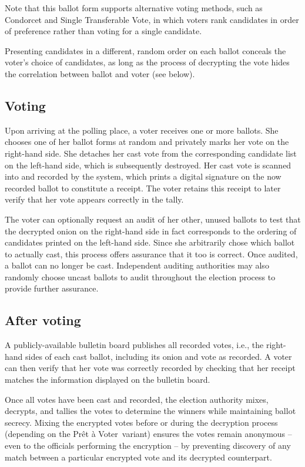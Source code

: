 \documentclass[10pt,twocolumn]{article}
\newcommand{\preta}{Pr\^{e}t \`{a}}
\newcommand{\pv}{\preta{} Voter}
\begin{document}
Note that this ballot form supports alternative voting methods, such as Condorcet and Single Transferable Vote, in which voters rank candidates in order of preference rather than voting for a single candidate.

Presenting candidates in a different, random order on each ballot conceals the voter's choice of candidates, as long as the process of decrypting the vote hides the correlation between ballot and voter (see below).

\subsection{Voting}

Upon arriving at the polling place, a voter receives one or more ballots.
She chooses one of her ballot forms at random and privately marks her vote on the right-hand side.
She detaches her cast vote from the corresponding candidate list on the left-hand side, which is subsequently destroyed.
Her cast vote is scanned into and recorded by the system, which prints a digital signature on the now recorded ballot to constitute a receipt.
The voter retains this receipt to later verify that her vote appears correctly in the tally.

The voter can optionally request an audit of her other, unused ballots to test that the decrypted onion on the right-hand side in fact corresponds to the ordering of candidates printed on the left-hand side.
Since she arbitrarily chose which ballot to actually cast, this process offers assurance that it too is correct.
Once audited, a ballot can no longer be cast.
Independent auditing authorities may also randomly choose uncast ballots to audit throughout the election process to provide further assurance.

\subsection{After voting}
A publicly-available bulletin board publishes all recorded votes, i.e., the right-hand sides of each cast ballot, including its onion and vote as recorded.
A voter can then verify that her vote was correctly recorded by checking that her receipt matches the information displayed on the bulletin board.

Once all votes have been cast and recorded, the election authority mixes, decrypts, and tallies the votes to determine the winners while maintaining ballot secrecy.
Mixing the encrypted votes before or during the decryption process (depending on the \pv\ variant) ensures the votes remain anonymous -- even to the officials performing the encryption -- by preventing discovery of any match between a particular encrypted vote and its decrypted counterpart.
\end{document}
